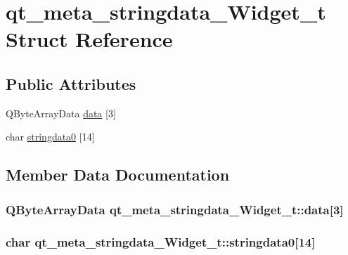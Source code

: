 \hypertarget{structqt__meta__stringdata___widget__t}{}\section{qt\+\_\+meta\+\_\+stringdata\+\_\+\+Widget\+\_\+t Struct Reference}
\label{structqt__meta__stringdata___widget__t}
\subsection*{Public Attributes}
\begin{DoxyCompactItemize}
\item 
Q\+Byte\+Array\+Data \hyperlink{structqt__meta__stringdata___widget__t_ae21052b7ec9e52d41a6fad5351c87ffc}{data} \mbox{[}3\mbox{]}
\item 
char \hyperlink{structqt__meta__stringdata___widget__t_a6c44677d08b68447369955e1bddad625}{stringdata0} \mbox{[}14\mbox{]}
\end{DoxyCompactItemize}


\subsection{Member Data Documentation}
\subsubsection[{\texorpdfstring{data}{data}}]{\setlength{\rightskip}{0pt plus 5cm}Q\+Byte\+Array\+Data qt\+\_\+meta\+\_\+stringdata\+\_\+\+Widget\+\_\+t\+::data\mbox{[}3\mbox{]}}\hypertarget{structqt__meta__stringdata___widget__t_ae21052b7ec9e52d41a6fad5351c87ffc}{}\label{structqt__meta__stringdata___widget__t_ae21052b7ec9e52d41a6fad5351c87ffc}
\subsubsection[{\texorpdfstring{stringdata0}{stringdata0}}]{\setlength{\rightskip}{0pt plus 5cm}char qt\+\_\+meta\+\_\+stringdata\+\_\+\+Widget\+\_\+t\+::stringdata0\mbox{[}14\mbox{]}}\hypertarget{structqt__meta__stringdata___widget__t_a6c44677d08b68447369955e1bddad625}{}\label{structqt__meta__stringdata___widget__t_a6c44677d08b68447369955e1bddad625}
